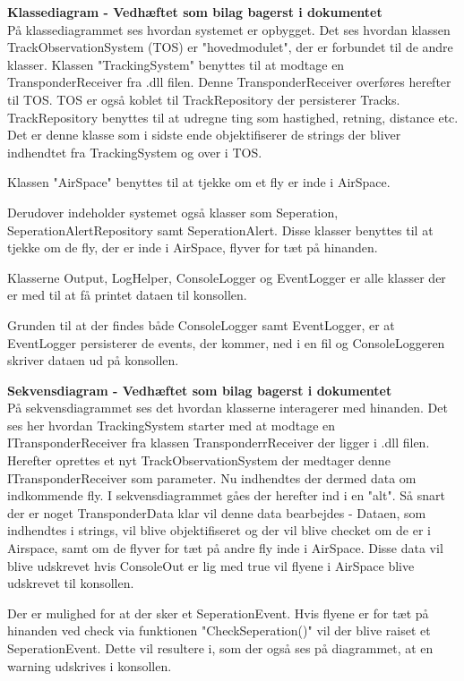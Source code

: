 \textbf{Klassediagram - Vedhæftet som bilag bagerst i dokumentet} \\
På klassediagrammet ses hvordan systemet er opbygget. \tabularnewline
Det ses hvordan klassen TrackObservationSystem (TOS) er "hovedmodulet", der er forbundet til de andre klasser.
Klassen "TrackingSystem" benyttes til at modtage en TransponderReceiver fra .dll filen. Denne TransponderReceiver overføres herefter til TOS.
TOS er også koblet til TrackRepository der persisterer Tracks. TrackRepository benyttes til at udregne ting som hastighed, retning, distance etc. Det er denne klasse som i sidste ende objektifiserer de strings der bliver indhendtet fra TrackingSystem og over i TOS.

Klassen "AirSpace" benyttes til at tjekke om et fly er inde i AirSpace.

Derudover indeholder systemet også klasser som Seperation, SeperationAlertRepository samt SeperationAlert. Disse klasser benyttes til at tjekke om de fly, der er inde i AirSpace, flyver for tæt på hinanden. 

Klasserne Output, LogHelper, ConsoleLogger og EventLogger er alle klasser der er med til at få printet dataen til konsollen. 

Grunden til at der findes både ConsoleLogger samt EventLogger, er at EventLogger persisterer de events, der kommer, ned i en fil og ConsoleLoggeren skriver dataen ud på konsollen. \newline

\textbf{Sekvensdiagram - Vedhæftet som bilag bagerst i dokumentet} \\
På sekvensdiagrammet ses det hvordan klasserne interagerer med hinanden. \tabularnewline
Det ses her hvordan TrackingSystem starter med at modtage en ITransponderReceiver fra klassen TransponderrReceiver der ligger i .dll filen. \tabularnewline
Herefter oprettes et nyt TrackObservationSystem der medtager denne ITransponderReceiver som parameter.\tabularnewline
Nu indhendtes der dermed data om indkommende fly. I sekvensdiagrammet gåes der herefter ind i en "alt". \tabularnewline
Så snart der er noget TransponderData klar vil denne data bearbejdes - Dataen, som indhendtes i strings, vil blive objektifiseret og der vil blive checket om de er i Airspace, samt om de flyver for tæt på andre fly inde i AirSpace.
Disse data vil blive udskrevet hvis ConsoleOut er lig med true vil flyene i AirSpace blive udskrevet til konsollen.

Der er mulighed for at der sker et SeperationEvent. \tabularnewline
Hvis flyene er for tæt på hinanden ved check via funktionen "CheckSeperation()" vil der blive raiset et SeperationEvent. 
Dette vil resultere i, som der også ses på diagrammet, at en warning udskrives i konsollen.








